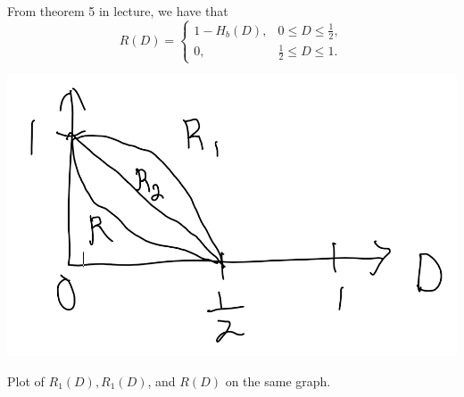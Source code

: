 \documentclass[
  coursecode={MTHE 477},
  assignmentname={Homework \homeworknumber},
  studentnumber=20053722,
  name={Bryan Hoang},
  draft,
]{
  ltxanswer%
}
\begin{document}
\begin{questions}
\begin{parts}
      \part{}
      \begin{solution}
        From theorem 5 in lecture, we have that
        \begin{equation*}
          R(D) = \begin{cases}
            1-H_{b}(D), &0 \le D \le \frac{1}{2}, \\
            0,          &\frac{1}{2} \le D \le 1.
          \end{cases}
        \end{equation*}
        \begin{answerfigure}
          \includegraphics{img/q-3-c-graph.png}
          \caption{Plot of \(R_{1}(D), R_{1}(D)\), and \(R(D)\) on the same graph.}
        \end{answerfigure}
      \end{solution}
    \end{parts}
  \end{questions}
\end{document}
